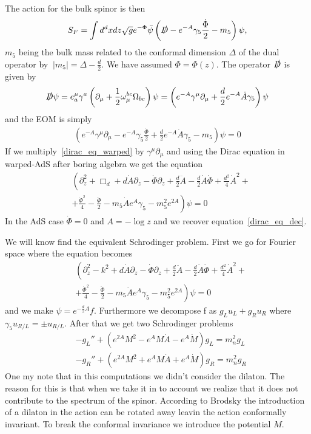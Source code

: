 \documentclass[12pt,a4paper]{article}
\begin{document}
The action for the bulk spinor is then
\begin{align}
    S_F = \int d^d x dz \sqrt{g} e^{-\Phi} \bar{\psi} \left( \slashed{D} - e^{-A} \gamma_5 \frac{\dot{\Phi}}{2} - m_5  \right) \psi,
\end{align}
$m_5$ being the bulk mass related to the conformal dimension $\Delta$ of the dual operator by $\
|m_5| = \Delta - \frac{d}{2}$. We have assumed $\Phi = \Phi\left(z\right)$.
The operator $\slashed{D}$ is given by
\begin{align}
    \slashed{D} \psi = e^{\mu}_a \gamma^a \left( \partial_\mu + \frac{1}{2} \omega_\mu^{bc} \Omega_{bc} \right) \psi = \left( e^{-A} \gamma^{\mu} \partial_\mu + \frac{d}{2} e^{-A} \dot{A} \gamma_5 \right)\psi
\end{align}
and the EOM is simply
\begin{align}
    \left( e^{-A} \gamma^{\mu} \partial_\mu -e^{-A} \gamma_5 \frac{\dot{\Phi}}{2}+ \frac{d}{2} e^{-A} \dot{A} \gamma_5 - m_5 \right)\psi = 0
\label{dirac_eq_warped}
\end{align}
If we multiply~\ref{dirac_eq_warped} by $\gamma^{\mu}\partial_\mu$ and using the Dirac equation in warped-AdS after boring algebra we get the equation
\begin{align}
    & \left( \partial_z^2 + \Box_d + d \dot{A} \partial_z -\dot{\Phi} \partial_z  + \frac{d}{2} \ddot{A} - \frac{d}{2} \dot{A}\dot{\Phi}+\frac{d^2}{4} \dot{A}^2 + \right. \\
    & \left. + \frac{\dot{\Phi}^2}{4} - \frac{\ddot{\Phi}}{2} - m_5 \dot{A} e^{A} \gamma_5 - m_5^2 e^{2A}\right) \psi = 0
\end{align}
In the AdS case $\dot{\Phi} = 0$ and $A = -\log z$ and we recover equation~\ref{dirac_eq_dec}.

We will know find the equivalent Schrodinger problem. First we go for Fourier space where the equation becomes
\begin{align}
    & \left( \partial_z^2 -k ^2 + d \dot{A} \partial_z -\dot{\Phi} \partial_z  + \frac{d}{2} \ddot{A} - \frac{d}{2} \dot{A}\dot{\Phi}+\frac{d^2}{4} \dot{A}^2 + \right. \\
    & \left. + \frac{\dot{\Phi}^2}{4} - \frac{\ddot{\Phi}}{2} - m_5 \dot{A} e^{A} \gamma_5 - m_5^2 e^{2A}\right) \psi = 0
\end{align}
and we make $\psi = e^{- \frac{d}{2} A} f$. Furthermore we decompose f as $g_L u_L + g_R u_R$ where $\gamma_5 u_{R/L} = \pm u_{R/L}$. After that we get two Schrodinger problems
\begin{align}
    &- g_L'' + \left( e^{2A} M^2 - e^{A} M \dot{A} - e^{A} \dot{M} \right)g_L = m_n^2 g_L \\
    &- g_R'' + \left( e^{2A} M^2 + e^{A} M \dot{A} + e^{A} \dot{M} \right)g_R = m_n^2 g_R
\end{align}
One my note that in this computations we didn't consider the dilaton. The reason for this is that when we take it in to account we realize that it does not contribute to the spectrum of the spinor. According to Brodsky the introduction of a dilaton in the action can be rotated away leavin the action conformally invariant. To break the conformal invariance we introduce the potential $M$.
\end{document}
